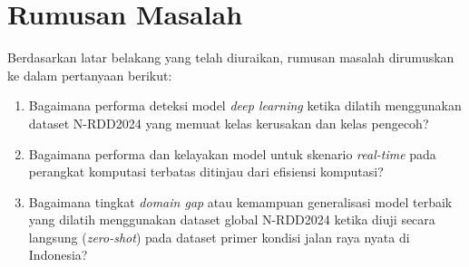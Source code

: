 \section{Rumusan Masalah}
Berdasarkan latar belakang yang telah diuraikan, rumusan masalah dirumuskan ke dalam pertanyaan berikut:
\begin{enumerate}
  \item Bagaimana performa deteksi model \textit{deep learning} ketika dilatih menggunakan dataset N-RDD2024 yang memuat kelas kerusakan dan kelas pengecoh?
  \item Bagaimana performa dan kelayakan model untuk skenario \textit{real-time} pada perangkat komputasi terbatas ditinjau dari efisiensi komputasi?
  \item Bagaimana tingkat \textit{domain gap} atau kemampuan generalisasi model terbaik yang dilatih menggunakan dataset global N-RDD2024 ketika diuji secara langsung (\textit{zero-shot}) pada dataset primer kondisi jalan raya nyata di Indonesia?
\end{enumerate}


